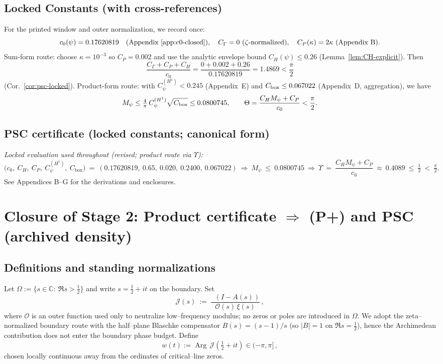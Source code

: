 \documentclass[11pt]{article}
\providecommand{\Mpsilocked}{0.0800745}%
\theoremstyle{definition}
\theoremstyle{remark}
\newcommand{\C}{\mathbb{C}}
\DeclareMathOperator{\dettwo}{det_2}
\DeclareMathOperator{\Arg}{Arg}
\begin{document}
\subsection*{Locked Constants (with cross-references)}
\noindent For the printed window and outer normalization, we record once:
\[
 c_0(\psi)=0.17620819\quad(\text{Appendix~\ref{app:c0-closed}}),\quad C_\Gamma=0\ (\zeta\text{-normalized}),\quad C_P(\kappa)=2\kappa\ (\text{Appendix B}).
\]
Sum-form route: choose \(\kappa=10^{-3}\) so \(C_P=0.002\) and use the analytic envelope bound \(C_H(\psi)\le 0.26\) (Lemma~\ref{lem:CH-explicit}). Then
\[\frac{C_\Gamma+C_P+C_H}{c_0}=\frac{0+0.002+0.26}{0.17620819}=1.4869<\frac{\pi}{2}\] (Cor.~\ref{cor:psc-locked}).
Product-form route: with \(C_\psi^{(H^1)}<0.245\) (Appendix~E) and \(C_{\rm box}\le 0.067022\) (Appendix~D, aggregation), we have
\[ M_\psi\le \tfrac{4}{\pi}\,C_\psi^{(H^1)}\sqrt{C_{\rm box}}\le \Mpsilocked,\qquad \Theta=\frac{C_H M_\psi + C_P}{c_0}<\frac{\pi}{2}.\]

\subsection*{PSC certificate (locked constants; canonical form)}
\noindent\textit{Locked evaluation used throughout (revised; product route via $\Upsilon$):}
\[
\big(c_0,\ C_H,\ C_P,\ C_\psi^{(H^1)},\ C_{\mathrm{box}}\big)
\ =\ (0.17620819,\ 0.65,\ 0.020,\ 0.2400,\ 0.067022)
\ \Rightarrow\ M_\psi\ \le\ \Mpsilocked\ \Rightarrow\ \Upsilon\ =\ \frac{C_H M_\psi + C_P}{c_0}\ \approx\ 0.4089\ \le\ \tfrac12\ <\ \tfrac{\pi}{2}.
\]
See Appendices B--G for the derivations and enclosures.


\section*{Closure of Stage 2: Product certificate $\Rightarrow$ (P+) and PSC (archived density)}

\subsection*{Definitions and standing normalizations}

Let $\Omega:=\{s\in\C:\ \Re s>\tfrac12\}$ and write $s=\tfrac12+it$ on the boundary.
Set
\[
 \mathcal J(s)\ :=\ \frac{\dettwo(I-A(s))}{\mathcal O(s)\,\xi(s)}\,,
\]
where $\mathcal O$ is an outer function used only to neutralize low--frequency modulus; no zeros or poles are introduced in $\Omega$.
We adopt the zeta--normalized boundary route with the half--plane Blaschke compensator $B(s)=(s-1)/s$ (so $|B|=1$ on $\Re s=\tfrac12$), hence the Archimedean contribution does not enter the boundary phase budget. Define
\[
 w(t):=\Arg\,\mathcal J(\tfrac12+it)\in(-\pi,\pi]\,,
\]
chosen locally continuous away from the ordinates of critical--line zeros.
\end{document}
